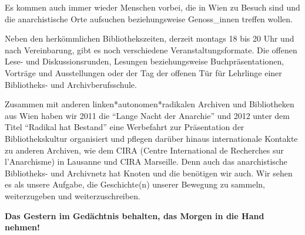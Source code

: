 \documentclass[a4paper,
fontsize=11pt,
oneside,
numbers=noperiodatend,
parskip=half-,
bibliography=totoc,
final
]{scrartcl}
\begin{document}
Es kommen auch immer wieder Menschen vorbei, die in Wien zu Besuch sind
und die anarchistische Orte aufsuchen beziehungsweise Genoss\_innen
treffen wollen.

Neben den herkömmlichen Bibliothekszeiten, derzeit montags 18 bis 20 Uhr
und nach Vereinbarung, gibt es noch verschiedene Veranstaltungsformate.
Die offenen Lese- und Diskussionsrunden, Lesungen beziehungsweise
Buchpräsentationen, Vorträge und Ausstellungen oder der Tag der offenen
Tür für Lehrlinge einer Bibliotheks- und Archivberufsschule.

Zusammen mit anderen linken*autonomen*radikalen Archiven und
Bibliotheken aus Wien haben wir 2011 die \enquote{Lange Nacht der
Anarchie} und 2012 unter dem Titel \enquote{Radikal hat Bestand} eine
Werbefahrt zur Präsentation der Bibliothekskultur organisiert und
pflegen darüber hinaus internationale Kontakte zu anderen Archiven, wie
dem CIRA (Centre International de Recherches sur l'Anarchisme) in
Lausanne und CIRA Marseille. Denn auch das anarchistische Bibliotheks-
und Archivnetz hat Knoten und die benötigen wir auch. Wir sehen es als
unsere Aufgabe, die Geschichte(n) unserer Bewegung zu sammeln,
weiterzugeben und weiterzuschreiben.

\textbf{Das Gestern im Gedächtnis behalten, das Morgen in die Hand
nehmen!}

\end{document}
